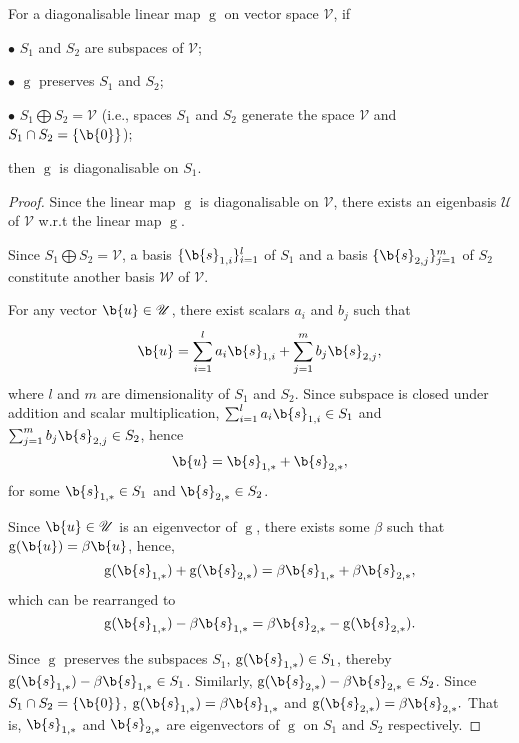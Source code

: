 \begin{lemma}\label{lemma:diag_in_subspace}
For a diagonalisable linear map $\operatorname{g}$ on vector space $\mathcal{V}$, if 

$\bullet$ $S_1$ and $S_2$ are subspaces of $\mathcal{V}$;

$\bullet$ $\operatorname{g}$ preserves $S_1$ and $S_2$;

$\bullet$ $S_1 \bigoplus S_2 = \mathcal{V}$ (i.e., spaces $S_1$ and $S_2$ generate the space $\mathcal{V}$ and $S_1 \cap S_2 = \{\b{0}\}$);

then $\operatorname{g}$ is diagonalisable on $S_1$.
\end{lemma}

\begin{proof}
Since the linear map $\operatorname{g}$ is diagonalisable on $\mathcal{V}$, there exists an eigenbasis $\mathscr{U}$ of $\mathcal{V}$ w.r.t the linear map $\operatorname{g}$.

Since $S_1 \bigoplus S_2 = \mathcal{V}$, a basis $\{\b{s}_{1,i}\}_{i=1}^{l}$ of $S_1$ and a basis $\{\b{s}_{2,j}\}_{j=1}^{m}$ of $S_2$ constitute another basis $\mathscr{W}$ of $\mathcal{V}$.

For any vector $\b{u} \in \mathscr{U}$, there exist scalars $a_i $ and $b_j $ such that  
$$ \b{u}  = \sum_{i=1}^{l} a_i  \b{s}_{1,i} + \sum_{j=1}^{m} b_j  \b{s}_{2,j}, $$
where $l$ and $m$ are dimensionality of $S_1$ and $S_2$. Since subspace is closed under addition and scalar multiplication, $\sum_{i=1}^{l} a_i  \b{s}_{1,i} \in S_1 $ and $\sum_{j=1}^{m} b_j  \b{s}_{2,j} \in S_2 $, hence
$$ \b{u}  = \b{s}_{1,*}  + \b{s}_{2,*} , $$
for some $\b{s}_{1,*}  \in S_1 $ and $\b{s}_{2,*}  \in S_2 $.

Since $\b{u}  \in \mathscr{U}$ is an eigenvector of $\operatorname{g}$, there exists some $\beta$ such that $\operatorname{g}(\b{u} ) = \beta \b{u} $, hence,
$$ \operatorname{g}(\b{s}_{1,*} ) + \operatorname{g}(\b{s}_{2,*} ) = \beta \b{s}_{1,*}  + \beta \b{s}_{2,*} ,$$
which can be rearranged to
$$ \operatorname{g}(\b{s}_{1,*} ) - \beta \b{s}_{1,*}  =  \beta \b{s}_{2,*}  - \operatorname{g}(\b{s}_{2,*} ).$$

Since $\operatorname{g}$ preserves the subspaces $S_1$, $\operatorname{g}(\b{s}_{1,*} ) \in S_1$, thereby $\operatorname{g}(\b{s}_{1,*} ) - \beta \b{s}_{1,*}  \in S_1$. Similarly, $\operatorname{g}(\b{s}_{2,*} ) - \beta \b{s}_{2,*}  \in S_2$. Since $S_1 \cap S_2 = \{\b{0}\}$, $\operatorname{g}(\b{s}_{1,*} ) = \beta \b{s}_{1,*} $ and $\operatorname{g}(\b{s}_{2,*} ) = \beta \b{s}_{2,*} .$ That is, $\b{s}_{1,*} $ and $\b{s}_{2,*} $ are eigenvectors of $\operatorname{g}$ on $S_1$ and $S_2$ respectively.


\end{proof}
